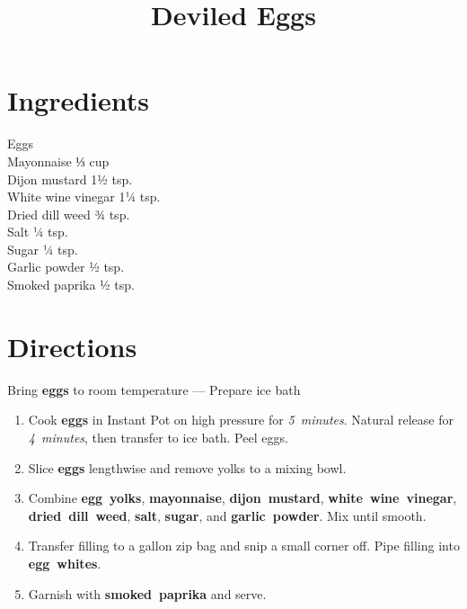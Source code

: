 \documentclass[11pt,letterpaper]{article}
\title{Deviled Eggs}
\author{}
\date{}
\begin{document}
\maketitle
\thispagestyle{empty}

\section*{Ingredients}
\setlength{\columnsep}{20pt}
\begin{multicols}{2}
\noindent
    Eggs  \\
    Mayonnaise \dotfill ⅓ cup \\
    Dijon mustard \dotfill 1½ tsp. \\
    White wine vinegar \dotfill 1¼ tsp. \\
    \columnbreak
    Dried dill weed \dotfill ¾ tsp. \\
    Salt \dotfill ¼ tsp. \\
    Sugar \dotfill ¼ tsp. \\
    Garlic powder \dotfill ½ tsp. \\
    Smoked paprika \dotfill ½ tsp. \\
\end{multicols}

\section*{Directions}

\noindent
Bring \textbf{eggs} to room temperature ---
Prepare ice bath

\begin{enumerate}
    \item Cook \textbf{eggs} in Instant Pot on high pressure for \textit{5~minutes}. Natural release for \textit{4~minutes}, then transfer to ice bath. Peel eggs.
    
    \item Slice \textbf{eggs} lengthwise and remove yolks to a mixing bowl.
    
    \item Combine \textbf{egg~yolks}, \textbf{mayonnaise}, \textbf{dijon~mustard}, \textbf{white~wine~vinegar}, \textbf{dried~dill~weed}, \textbf{salt}, \textbf{sugar}, and \textbf{garlic~powder}. Mix until smooth.
    
    \item Transfer filling to a gallon zip bag and snip a small corner off. Pipe filling into \textbf{egg~whites}.
    
    \item Garnish with \textbf{smoked~paprika} and serve.
\end{enumerate}
\end{document}
